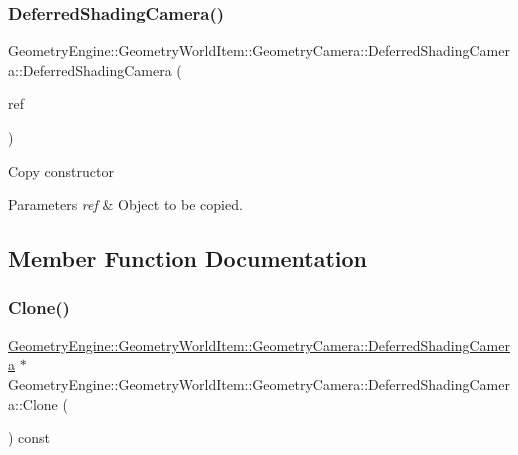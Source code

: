\subsubsection{\texorpdfstring{DeferredShadingCamera()}{DeferredShadingCamera()}\hspace{0.1cm}{\footnotesize\ttfamily [2/2]}}
{\footnotesize\ttfamily Geometry\+Engine\+::\+Geometry\+World\+Item\+::\+Geometry\+Camera\+::\+Deferred\+Shading\+Camera\+::\+Deferred\+Shading\+Camera (\begin{DoxyParamCaption}\item[{const \mbox{\hyperlink{class_geometry_engine_1_1_geometry_world_item_1_1_geometry_camera_1_1_deferred_shading_camera}{Deferred\+Shading\+Camera}} \&}]{ref }\end{DoxyParamCaption})}

Copy constructor 
\begin{DoxyParams}{Parameters}
{\em ref} & Object to be copied. \\
\hline
\end{DoxyParams}


\subsection{Member Function Documentation}
\mbox{\label{class_geometry_engine_1_1_geometry_world_item_1_1_geometry_camera_1_1_deferred_shading_camera_ac020fe14bc32f3fdbd0c9423af1c975f}} 
\subsubsection{\texorpdfstring{Clone()}{Clone()}}
{\footnotesize\ttfamily \mbox{\hyperlink{class_geometry_engine_1_1_geometry_world_item_1_1_geometry_camera_1_1_deferred_shading_camera}{Geometry\+Engine\+::\+Geometry\+World\+Item\+::\+Geometry\+Camera\+::\+Deferred\+Shading\+Camera}} $\ast$ Geometry\+Engine\+::\+Geometry\+World\+Item\+::\+Geometry\+Camera\+::\+Deferred\+Shading\+Camera\+::\+Clone (\begin{DoxyParamCaption}{ }\end{DoxyParamCaption}) const\hspace{0.3cm}{\ttfamily [virtual]}}

